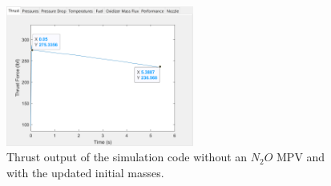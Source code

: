 \documentclass[9pt]{article} %
\numberwithin{equation}{section} %
\begin{document}
\begin{figure}[!htb] 
    \centering
    \includegraphics[scale=0.5, width=0.55\textwidth, trim={0cm 0cm 0cm 0cm}, clip]{system_sim_files/stanford_final_thrust.png} %
    \caption{Thrust output of the simulation code without an $N_{2}O$ MPV and with the updated initial masses.}
    \label{fig:stanford_final_thrust}
\end{figure}
\end{document}

